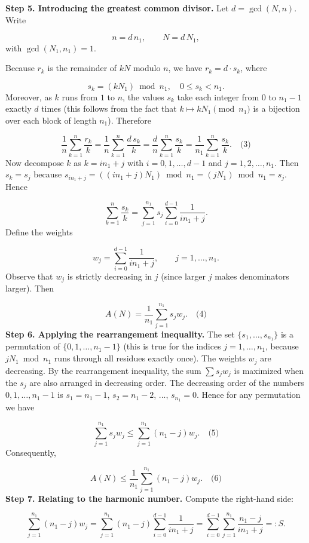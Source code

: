 \textbf{Step 5. Introducing the greatest common divisor.} Let \(d = \gcd(N,n)\). Write\par
\[
n = d\,n_1,\qquad N = d\,N_1,
\]
with \(\gcd(N_1,n_1)=1\).\par
Because \(r_k\) is the remainder of \(kN\) modulo \(n\), we have \(r_k = d\cdot s_k\), where\par
\[
s_k = (k N_1) \bmod n_1,\quad 0\le s_k < n_1.
\]
Moreover, as \(k\) runs from \(1\) to \(n\), the values \(s_k\) take each integer from \(0\) to \(n_1-1\) exactly \(d\) times (this follows from the fact that \(k\mapsto kN_1\pmod{n_1}\) is a bijection over each block of length \(n_1\)). Therefore\par
\[
\frac1n\sum_{k=1}^{n}\frac{r_k}{k} = \frac1n\sum_{k=1}^{n}\frac{d\,s_k}{k} = \frac{d}{n}\sum_{k=1}^{n}\frac{s_k}{k} = \frac{1}{n_1}\sum_{k=1}^{n}\frac{s_k}{k}. \quad\text{(3)}
\]
Now decompose \(k\) as \(k = i n_1 + j\) with \(i=0,1,\dots,d-1\) and \(j=1,2,\dots,n_1\). Then \(s_k = s_j\) because \(s_{i n_1 + j} = ((i n_1 + j)N_1)\bmod n_1 = (j N_1)\bmod n_1 = s_j\). Hence\par
\[
\sum_{k=1}^{n}\frac{s_k}{k} = \sum_{j=1}^{n_1} s_j \sum_{i=0}^{d-1}\frac{1}{i n_1 + j}.
\]
Define the weights\par
\[
w_j = \sum_{i=0}^{d-1}\frac{1}{i n_1 + j},\qquad j=1,\dots,n_1.
\]
Observe that \(w_j\) is strictly decreasing in \(j\) (since larger \(j\) makes denominators larger). Then\par
\[
A(N) = \frac{1}{n_1}\sum_{j=1}^{n_1} s_j w_j. \quad\text{(4)}
\]
\textbf{Step 6. Applying the rearrangement inequality.} The set \(\{s_1,\dots,s_{n_1}\}\) is a permutation of \(\{0,1,\dots,n_1-1\}\) (this is true for the indices \(j=1,\dots,n_1\), because \(j N_1 \bmod n_1\) runs through all residues exactly once). The weights \(w_j\) are decreasing. By the rearrangement inequality, the sum \(\sum s_j w_j\) is maximized when the \(s_j\) are also arranged in decreasing order. The decreasing order of the numbers \(0,1,\dots,n_1-1\) is \(s_1=n_1-1\), \(s_2=n_1-2\), ..., \(s_{n_1}=0\). Hence for any permutation we have\par
\[
\sum_{j=1}^{n_1} s_j w_j \le \sum_{j=1}^{n_1} (n_1 - j) w_j. \quad\text{(5)}
\]
Consequently,\par
\[
A(N) \le \frac{1}{n_1}\sum_{j=1}^{n_1} (n_1 - j) w_j. \quad\text{(6)}
\]
\textbf{Step 7. Relating to the harmonic number.} Compute the right-hand side:\par
\[
\sum_{j=1}^{n_1} (n_1 - j) w_j = \sum_{j=1}^{n_1} (n_1 - j)\sum_{i=0}^{d-1}\frac{1}{i n_1 + j} = \sum_{i=0}^{d-1}\sum_{j=1}^{n_1}\frac{n_1 - j}{i n_1 + j} =: S.
\]
